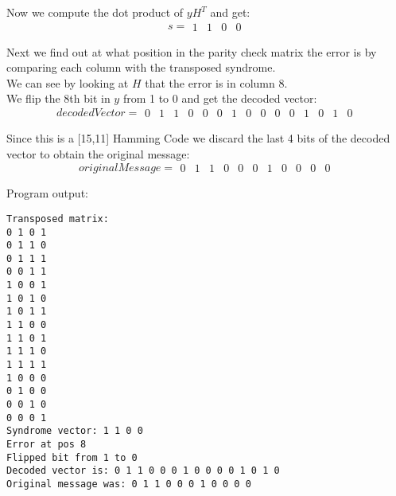 \documentclass{article}
\begin{document}
Now we compute the dot product of $yH^{T}$ and get:\\
$$s = 
\begin{matrix}
	1 & 1 & 0 & 0
\end{matrix}
$$

Next we find out at what position in the parity check matrix the error is by comparing each column with the transposed syndrome.\\
We can see by looking at $H$ that the error is in column 8.\\
We flip the 8th bit in $y$ from 1 to 0 and get the decoded vector:\\
$$decoded Vector = 
\begin{matrix}
	0 & 1 & 1 & 0 & 0 & 0 & 1 & 0 & 0 & 0 & 0 & 1 & 0 & 1 & 0
\end{matrix}
$$

Since this is a [15,11] Hamming Code we discard the last 4 bits of the decoded vector to obtain the original message:\\
$$original Message = 
\begin{matrix}
	0 & 1 & 1 & 0 & 0 & 0 & 1 & 0 & 0 & 0 & 0
\end{matrix}
$$

Program output:
\begin{verbatim}
Transposed matrix: 
0 1 0 1 
0 1 1 0 
0 1 1 1 
0 0 1 1 
1 0 0 1 
1 0 1 0 
1 0 1 1 
1 1 0 0 
1 1 0 1 
1 1 1 0 
1 1 1 1 
1 0 0 0 
0 1 0 0 
0 0 1 0 
0 0 0 1 
Syndrome vector: 1 1 0 0 
Error at pos 8
Flipped bit from 1 to 0
Decoded vector is: 0 1 1 0 0 0 1 0 0 0 0 1 0 1 0 
Original message was: 0 1 1 0 0 0 1 0 0 0 0 

\end{verbatim}
\end{document}
